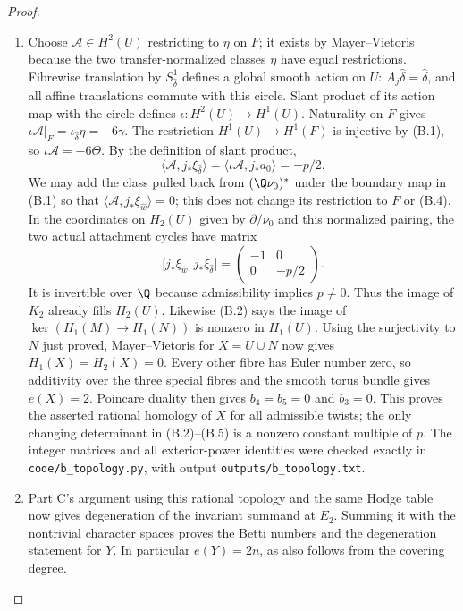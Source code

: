 \begin{proof}
\begin{enumerate}[label={$\langle1\rangle$\arabic*.},leftmargin=*]
\item Choose $\mathcal A\in H^2(U)$ restricting to $\eta$ on $F$;
it exists by Mayer--Vietoris because the two transfer-normalized
classes $\eta$ have equal restrictions. Fibrewise translation by
$S^1_{\hat\delta}$ defines a global smooth action on $U$:
$A_j\hat\delta=\hat\delta$, and all affine translations commute
with this circle. Slant product of its action map with the circle
defines $\iota:H^2(U)\to H^1(U)$. Naturality on $F$ gives
$\iota\mathcal A|_F=\iota_{\hat\delta}\eta=-6\gamma$.
The restriction $H^1(U)\to H^1(F)$ is injective by (B.1), so
$\iota\mathcal A=-6\Theta$. By the definition of slant product,
\[
 \langle\mathcal A,j_*\xi_{\hat\delta}\rangle
 =\langle\iota\mathcal A,j_*a_0\rangle=-p/2.           \tag{B.4}
\]
We may add the class pulled back from $(\Q\nu_0)^*$ under
the boundary map in (B.1) so that
$\langle\mathcal A,j_*\xi_{\hat w}\rangle=0$;
this does not change its restriction to $F$ or (B.4).
In the coordinates on $H_2(U)$ given by $\partial/\nu_0$ and
this normalized pairing, the two actual attachment cycles have
matrix
\[
 \bigl[j_*\xi_{\hat w}\ \ j_*\xi_{\hat\delta}\bigr]
 =\begin{pmatrix}-1&0\\0&-p/2\end{pmatrix}.             \tag{B.5}
\]
It is invertible over $\Q$ because admissibility implies
$p\ne0$. Thus the image of $K_2$ already fills $H_2(U)$.
Likewise (B.2) says the image of $\ker(H_1(M)\to H_1(N))$
is nonzero in $H_1(U)$. Using the surjectivity to $N$ just proved,
Mayer--Vietoris for $X=U\cup N$ now gives $H_1(X)=H_2(X)=0$.
Every other fibre has Euler number zero, so additivity over the
three special fibres and the smooth torus bundle gives $e(X)=2$.
Poincare duality then gives $b_4=b_5=0$ and $b_3=0$.
This proves the asserted rational homology of $X$ for all admissible
twists; the only changing determinant in (B.2)--(B.5) is a nonzero
constant multiple of $p$. The integer matrices and all exterior-power
identities were checked exactly in \texttt{code/b\_topology.py},
with output \texttt{outputs/b\_topology.txt}.

\item Part C's argument using this rational topology and the same Hodge
table now gives degeneration of the invariant summand at $E_2$.
Summing it with the nontrivial character spaces proves the Betti
numbers and the degeneration statement for $Y$. In particular
$e(Y)=2n$, as also follows from the covering degree.
\end{enumerate}
\end{proof}

